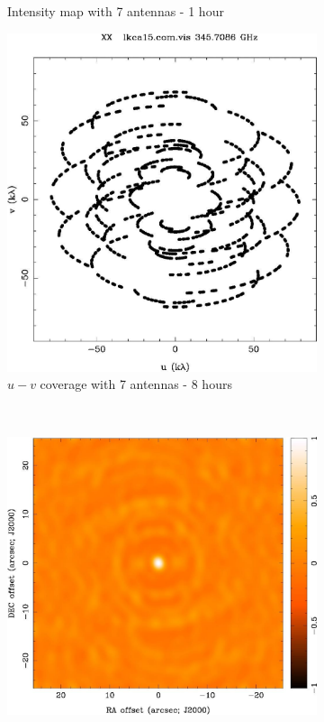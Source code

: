 \begin{figure}
\begin{subfigure}[b]{0.5\textwidth}
                \caption{Intensity map with 7 antennas - 1 hour }
                \label{fig:lm7ant1h}
        \end{subfigure}
        \begin{subfigure}[b]{0.5\textwidth}
                \includegraphics[scale=0.35]{Figures/uv-coverage/7antcov8h}
                \caption{$u-v$ coverage with 7 antennas - 8 hours }
                \label{fig:uv7ant8h}
        \end{subfigure}%
        ~ %
        \begin{subfigure}[b]{0.5\textwidth}
                \includegraphics[scale=0.4]{Figures/uv-coverage/7antIma8h}

\end{subfigure}
\end{figure}
